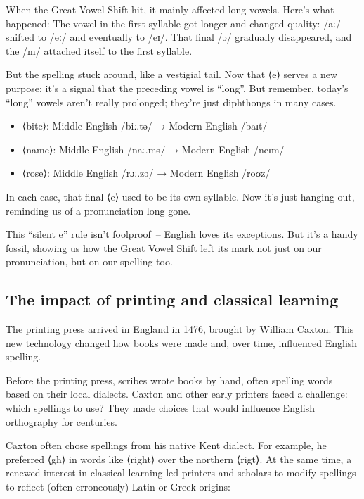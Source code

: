 When the Great Vowel Shift hit, it mainly affected long vowels. Here's what happened: The vowel in the first syllable got longer and changed quality: /aː/ shifted to /eː/ and eventually to /eɪ/. That final /ə/ gradually disappeared, and the /m/ attached itself to the first syllable.

But the spelling stuck around, like a vestigial tail. Now that ⟨e⟩ serves a new purpose: it's a signal that the preceding vowel is ``long''. But remember, today's ``long'' vowels aren't really prolonged; they're just diphthongs in many cases.

\begin{itemize}[noitemsep]
    \item ⟨bite⟩: Middle English /biː.tə/ → Modern English /baɪt/
    \item ⟨name⟩: Middle English /naː.mə/ → Modern English /neɪm/
    \item ⟨rose⟩: Middle English /rɔː.zə/ → Modern English /roʊz/
\end{itemize}

In each case, that final ⟨e⟩ used to be its own syllable. Now it's just hanging out, reminding us of a pronunciation long gone.

This ``silent e'' rule isn't foolproof~-- English loves its exceptions. But it's a handy fossil, showing us how the Great Vowel Shift left its mark not just on our pronunciation, but on our spelling too.

\subsection{The impact of printing and classical learning}

The printing press arrived in England in 1476, brought by William Caxton. This new technology changed how books were made and, over time, influenced English spelling.

Before the printing press, scribes wrote books by hand, often spelling words based on their local dialects. Caxton and other early printers faced a challenge: which spellings to use? They made choices that would influence English orthography for centuries.

Caxton often chose spellings from his native Kent dialect. For example, he preferred ⟨gh⟩ in words like ⟨right⟩ over the northern ⟨rigt⟩. At the same time, a renewed interest in classical learning led printers and scholars to modify spellings to reflect (often erroneously) Latin or Greek origins:

